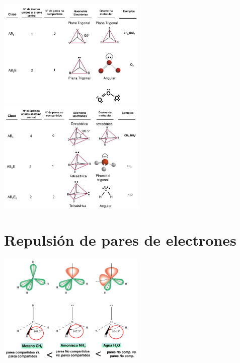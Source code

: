         \saltoPag%
        \begin{center}
            \includegraphics[width=7cm]{./imagenes/geometriaElectronica3.png}
            \includegraphics[width=7cm]{./imagenes/geometriaElectronica4.png}
        \end{center}
    \section{Repulsión de pares de electrones}
        \begin{center} \includegraphics[width=7cm]{./imagenes/ejemplosRepulsionParesElectrones.png} \end{center}
        
